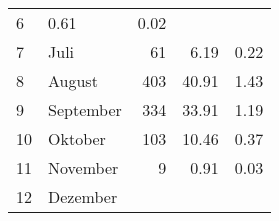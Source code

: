 \begin{longtable}{lXrrr}
       \num{6} &
       \num[round-mode=places,round-precision=2]{0.61} &
         \num[round-mode=places,round-precision=2]{0.02} \\

     7 &
     \multicolumn{1}{X}{ Juli   } &


       \num{61} &
       \num[round-mode=places,round-precision=2]{6.19} &
         \num[round-mode=places,round-precision=2]{0.22} \\

     8 &
     \multicolumn{1}{X}{ August   } &


       \num{403} &
       \num[round-mode=places,round-precision=2]{40.91} &
         \num[round-mode=places,round-precision=2]{1.43} \\

     9 &
     \multicolumn{1}{X}{ September   } &


       \num{334} &
       \num[round-mode=places,round-precision=2]{33.91} &
         \num[round-mode=places,round-precision=2]{1.19} \\

     10 &
     \multicolumn{1}{X}{ Oktober   } &


       \num{103} &
       \num[round-mode=places,round-precision=2]{10.46} &
         \num[round-mode=places,round-precision=2]{0.37} \\

     11 &
     \multicolumn{1}{X}{ November   } &


       \num{9} &
       \num[round-mode=places,round-precision=2]{0.91} &
         \num[round-mode=places,round-precision=2]{0.03} \\

     12 &
     \multicolumn{1}{X}{ Dezember   } &



\end{longtable}
